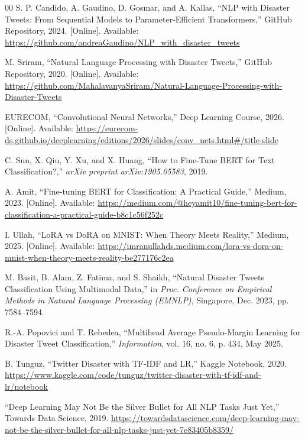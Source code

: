 \documentclass[conference]{IEEEtran}
\begin{document}
\begin{thebibliography}{00}
S. P. Candido, A. Gaudino, D. Gosmar, and A. Kallas, 
``NLP with Disaster Tweets: From Sequential Models to Parameter-Efficient Transformers,'' 
GitHub Repository, 2024. [Online]. Available: \url{https://github.com/andreaGaudino/NLP_with_disaster_tweets}

M. Sriram, ``Natural Language Processing with Disaster Tweets,'' 
GitHub Repository, 2020. [Online]. Available: \url{https://github.com/MahalavanyaSriram/Natural-Language-Processing-with-Disaster-Tweets}

EURECOM, ``Convolutional Neural Networks,'' Deep Learning Course, 2026. [Online]. Available: \url{https://eurecom-ds.github.io/deeplearning/editions/2026/slides/conv_nets.html#/title-slide}

C. Sun, X. Qiu, Y. Xu, and X. Huang, ``How to Fine-Tune BERT for Text Classification?,'' \textit{arXiv preprint arXiv:1905.05583}, 2019.

A. Amit, ``Fine-tuning BERT for Classification: A Practical Guide,'' Medium, 2023. [Online]. Available: \url{https://medium.com/@heyamit10/fine-tuning-bert-for-classification-a-practical-guide-b8c1c56f252c}

I. Ullah, ``LoRA vs DoRA on MNIST: When Theory Meets Reality,'' Medium, 2025. [Online]. Available: \url{https://imranullahds.medium.com/lora-vs-dora-on-mnist-when-theory-meets-reality-be277176c2ea}

M. Basit, B. Alam, Z. Fatima, and S. Shaikh,
``Natural Disaster Tweets Classification Using Multimodal Data,''
in \textit{Proc. Conference on Empirical Methods in Natural Language
Processing (EMNLP)}, Singapore, Dec. 2023, pp. 7584--7594.

R.-A. Popovici and T. Rebedea,
``Multihead Average Pseudo-Margin Learning for Disaster Tweet
Classification,''
\textit{Information}, vol. 16, no. 6, p. 434, May 2025.

B. Tunguz,
``Twitter Disaster with TF-IDF and LR,''
Kaggle Notebook, 2020.
\url{https://www.kaggle.com/code/tunguz/twitter-disaster-with-tf-idf-and-lr/notebook}

``Deep Learning May Not Be the Silver Bullet for All NLP Tasks Just Yet,''
Towards Data Science, 2019.
\url{https://towardsdatascience.com/deep-learning-may-not-be-the-silver-bullet-for-all-nlp-tasks-just-yet-7e83405b8359/}

\end{thebibliography}
\end{document}
